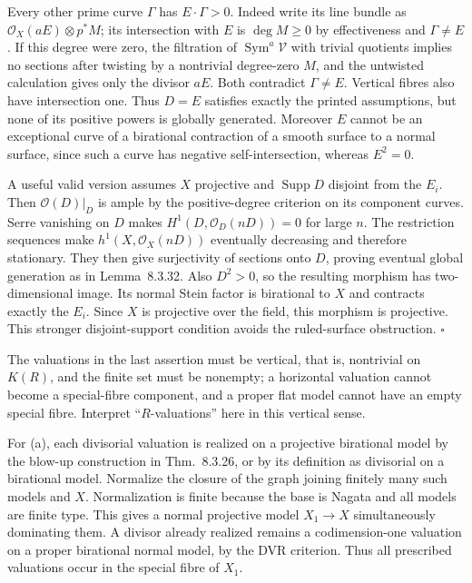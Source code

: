 \documentclass[11pt]{article}
\let\chapterexercise\exercise
\renewcommand{\exercise}[2]{\Needspace{8\baselineskip}\chapterexercise{#1}{#2}}
\begin{document}
Every other prime curve $\Gamma$ has $E\cdot\Gamma>0$. Indeed write its line bundle as $\mathcal O_X(aE)\otimes p^*M$; its intersection with $E$ is $\deg M\ge0$ by effectiveness and $\Gamma\ne E$. If this degree were zero, the filtration of $\operatorname{Sym}^a\mathcal V$ with trivial quotients implies no sections after twisting by a nontrivial degree-zero $M$, and the untwisted calculation gives only the divisor $aE$. Both contradict $\Gamma\ne E$. Vertical fibres also have intersection one. Thus $D=E$ satisfies exactly the printed assumptions, but none of its positive powers is globally generated. Moreover $E$ cannot be an exceptional curve of a birational contraction of a smooth surface to a normal surface, since such a curve has negative self-intersection, whereas $E^2=0$.

A useful valid version assumes $X$ projective and $\operatorname{Supp}D$ disjoint from the $E_i$. Then $\mathcal O(D)|_D$ is ample by the positive-degree criterion on its component curves. Serre vanishing on $D$ makes $H^1(D,\mathcal O_D(nD))=0$ for large $n$. The restriction sequences make $h^1(X,\mathcal O_X(nD))$ eventually decreasing and therefore stationary. They then give surjectivity of sections onto $D$, proving eventual global generation as in Lemma~8.3.32. Also $D^2>0$, so the resulting morphism has two-dimensional image. Its normal Stein factor is birational to $X$ and contracts exactly the $E_i$. Since $X$ is projective over the field, this morphism is projective. This stronger disjoint-support condition avoids the ruled-surface obstruction. \hfill$\square$

\pf
The valuations in the last assertion must be vertical, that is, nontrivial on $K(R)$, and the finite set must be nonempty; a horizontal valuation cannot become a special-fibre component, and a proper flat model cannot have an empty special fibre. Interpret ``$R$-valuations'' here in this vertical sense.

For (a), each divisorial valuation is realized on a projective birational model by the blow-up construction in Thm.~8.3.26, or by its definition as divisorial on a birational model. Normalize the closure of the graph joining finitely many such models and $X$. Normalization is finite because the base is Nagata and all models are finite type. This gives a normal projective model $X_1\to X$ simultaneously dominating them. A divisor already realized remains a codimension-one valuation on a proper birational normal model, by the DVR criterion. Thus all prescribed valuations occur in the special fibre of $X_1$.
\end{document}

